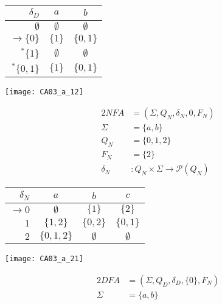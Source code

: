 {\begin{center}
\begin{minipage}[c]{0.28\textwidth}
\begin{tabular}{ r | c c }
			$\delta_D$ & $a$ & $b$ \\ \hline
			$\emptyset          $ & $\emptyset$ & $\emptyset$ \\
			$\rightarrow \{0\}$ & $\{1\}$ & $\{0,1\}$ \\
			$^\ast       \{1\}$ & $\emptyset$ & $\emptyset$ \\
			$^\ast       \{0,1\}$ & $\{1\}$ & $\{0,1\}$
		\end{tabular}
	\end{minipage}%
	\begin{minipage}[c]{0.38\textwidth}
		\texttt{[image: CA03\_a\_12]}
	\end{minipage}
\end{center}
\begin{center}
	\begin{minipage}[c]{0.30\textwidth}
		\begin{alignat*}{2}
			NFA      &= (\Sigma, Q_N, \delta_N,0,F_N)\\
			\Sigma   &= \{a,b\}\\
			Q_N      &= \{0,1,2\}\\
			F_N      &= \{2\}\\
			\delta_N &\colon Q_N \times \Sigma \rightarrow \mathscr{P}(Q_N)		
		\end{alignat*}
	\end{minipage}%
	\begin{minipage}[c]{0.35\textwidth}
		\begin{tabular}{ r | c c c }
			$\delta_N$ & $a$ & $b$ & $c$ \\ \hline
			$\rightarrow 0$ & $\emptyset$ & $\{1\}  $ & $\{2\}  $\\
			$            1$ & $\{1,2\}  $ & $\{0,2\}$ & $\{0,1\}$\\
			$            2$ & $\{0,1,2\}$ & $\emptyset$ & $\emptyset$\\
		\end{tabular}
	\end{minipage}%
	\begin{minipage}[c]{0.25\textwidth}
		\texttt{[image: CA03\_a\_21]}
	\end{minipage}
\end{center}
\begin{center}
	\begin{minipage}[c]{0.55\textwidth}
		\begin{alignat*}{2}
			DFA      &= (\Sigma, Q_D, \delta_D,\{0\},F_N)\\
			\Sigma   &= \{a,b\}\\

\end{alignat*}
\end{minipage}
\end{center}}
